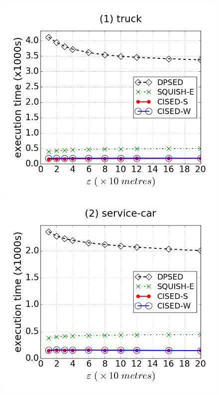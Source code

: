 \begin{figure}[tb!]
\centering
\includegraphics[scale = 0.250]{figures/Exp-time-epsilon-truck.png}
\includegraphics[scale = 0.250]{figures/Exp-time-epsilon-service.png}

\end{figure}
